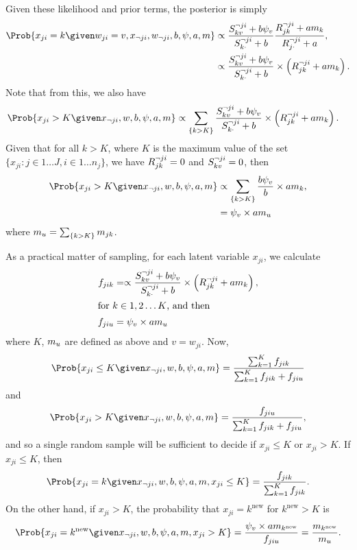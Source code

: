 Given these likelihood and prior terms, the posterior is simply
\begin{align*}
	\Prob{x_{ji} = k \given w_{ji} = v, x_{\neg ji}, w_{\neg ji}, b, \psi, a,m}
	&\propto\frac{\rji{S}{kv}{ji} + b \psi_{v}}{\rji{S}{k\cdot}{ji} + b} \frac{\rji{R}{jk}{ji} + am_{k}}{\rji{R}{j\cdot}{ji} + a},\\
	&\propto\frac{\rji{S}{kv}{ji} + b \psi_{v}}{\rji{S}{k\cdot}{ji} + b} \times \left(\rji{R}{jk}{ji} + am_{k}\right).
\end{align*}
Note that from this, we also have
\begin{align*}
	\Prob{x_{ji} > K \given x_{\neg ji}, w, b, \psi, a,m}
	&\propto
	\sum_{\{k > K\}} 
	\frac{\rji{S}{kv}{ji} + b \psi_{v}}{\rji{S}{k\cdot}{ji} + b} \times \left(\rji{R}{jk}{ji} + am_{k}\right).
\end{align*}
Given that for all $k > K$, where $K$ is the maximum value of the set 
	$\{x_{ji} \colon j \in 1\ldots J, i\in 1 \ldots n_j\}$, we have $\rji{R}{jk}{ji} = 0$ and $\rji{S}{kv}{ji} = 0$, then
\begin{align*}
	\Prob{x_{ji} > K \given x_{\neg ji}, w, b, \psi, a, m}
	&\propto
	\sum_{\{k > K\}} 
	\frac{b \psi_{v}}{b} \times am_{k},\\
	&=
	\psi_v \times a m_{\unrep} 
\end{align*}
where $m_{\unrep} = \sum_{\{k > K\}} m_{jk}$.


As a practical matter of sampling, for each latent variable $x_{ji}$, we calculate 
\begin{align*}
	f_{jik} &= \propto\frac{\rji{S}{kv}{ji} + b \psi_{v}}{\rji{S}{k\cdot}{ji} + b} \times \left(\rji{R}{jk}{ji} + am_{k}\right),\\
\intertext{for $k \in 1, 2 \ldots K$, and then}
	f_{ji\unrep} &= \psi_{v} \times a m_{\unrep}
\end{align*}
where $K$, $m_{\unrep}$ are defined as above and $v = w_{ji}$.  Now,
\[
	\Prob{x_{ji} \leq K \given x_{\neg ji}, w, b, \psi, a, m} = \frac{\sum_{k=1}^K f_{jik}}{\sum_{k=1}^K f_{jik} + f_{ji\unrep}}
\]
and
\[
	\Prob{x_{ji}  > K \given x_{\neg ji}, w, b, \psi, a, m} = \frac{ f_{ji\unrep}}{\sum_{k=1}^K f_{jik} + f_{ji\unrep}},
\]
and so a single random sample will be sufficient to decide if $x_{ji} \leq K$ or $x_{ji} > K$. If $x_{ji} \leq K$, then
\[
	\Prob{x_{ji} = k \given x_{\neg ji}, w, b, \psi, a, m, x_{ji} \leq K} = \frac{f_{jik}}{\sum_{k=1}^K f_{jik}}. 
	\]
On the other hand, if $x_{ji} > K$, the probability that $x_{ji} = k^{\text{new}}$ for $k^{\text{new}} > K$ is
\[
	\Prob{x_{ji} = k^{\text{new}} \given x_{\neg ji}, w, b, \psi, a, m, x_{ji} > K} = \frac{\psi_v \times a m_{k^{\text{new}}}}{f_{ji\unrep}} = \frac{m_{k^{\text{new}}}}{m_{\unrep}}.
\]

